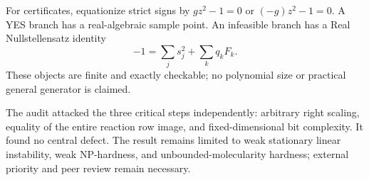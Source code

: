 \documentclass[10pt]{article}
\begin{document}
For certificates, equationize strict signs by $gz^2-1=0$ or
$(-g)z^2-1=0$.  A YES branch has a real-algebraic sample point.  An infeasible
branch has a Real Nullstellensatz identity
\[
 -1=\sum_j s_j^2+\sum_kq_kF_k.
\]
These objects are finite and exactly checkable; no polynomial size or practical
general generator is claimed.

The audit attacked the three critical steps independently: arbitrary right
scaling, equality of the entire reaction row image, and fixed-dimensional bit
complexity.  It found no central defect.  The result remains limited to weak
stationary linear instability, weak NP-hardness, and unbounded-molecularity
hardness; external priority and peer review remain necessary.
\end{document}

